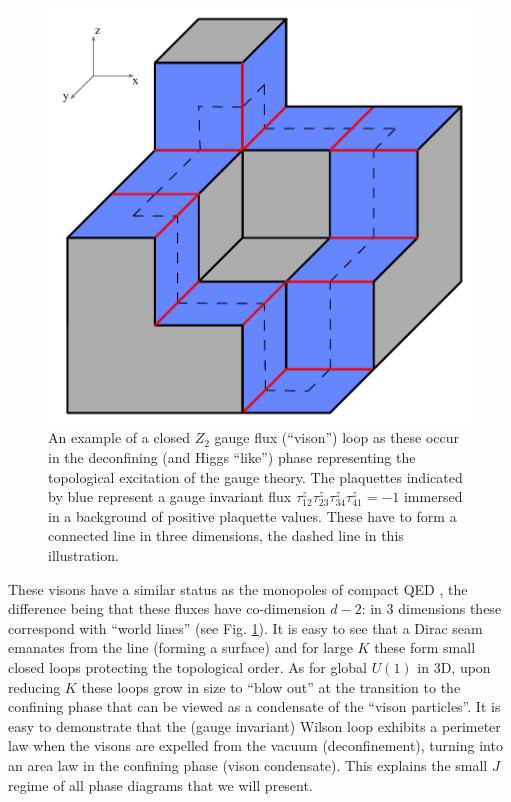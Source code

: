 \begin{figure}[!h]
	\centering
	\includegraphics[scale=.5]{figures/chapter2/Looptopil.pdf}
	\caption{An example of a closed $Z_2$ gauge flux (``vison'') loop as these occur in the deconfining (and Higgs ``like'') phase representing the topological excitation of the gauge theory. The plaquettes indicated by blue represent a gauge invariant  flux $\tau^z_{12}\tau^z_{23}\tau^z_{34}\tau^z_{41} = -1$ immersed in a background of positive plaquette values. These have to form a connected line in three dimensions, the dashed line in this illustration. } 
	\label{loopexample}
\end{figure} 


These visons have a similar status as the monopoles of compact QED \cite{PolyakovQED}, the difference being that these fluxes have co-dimension $d-2$: in 3 dimensions these correspond with ``world lines'' (see Fig. \ref{loopexample}). It is easy to see that a Dirac seam emanates from the line (forming a surface) and for large $K$ these form small closed loops protecting the topological order. As for global $U(1)$ in 3D, upon reducing $K$ these loops grow in size to ``blow out'' at the transition to the confining phase that can be viewed as a condensate of the ``vison particles''. It is easy to demonstrate \cite{Kogut} that the (gauge invariant) Wilson loop exhibits a perimeter law when the visons are expelled from the vacuum (deconfinement), turning into an area law in the confining phase (vison condensate). This explains the small $J$ regime of all phase diagrams that we will present. 

